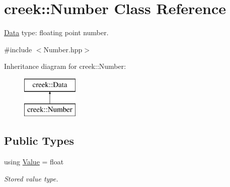 \hypertarget{classcreek_1_1_number}{}\section{creek\+:\+:Number Class Reference}
\label{classcreek_1_1_number}


\hyperlink{classcreek_1_1_data}{Data} type\+: floating point number.  




{\ttfamily \#include $<$Number.\+hpp$>$}

Inheritance diagram for creek\+:\+:Number\+:\begin{figure}[H]
\begin{center}
\leavevmode
\includegraphics[height=2.000000cm]{classcreek_1_1_number}
\end{center}
\end{figure}
\subsection*{Public Types}
\begin{DoxyCompactItemize}
\item 
using \hyperlink{classcreek_1_1_number_ac7b75fc8a57a0a16fa2417b57a538a18}{Value} = float\hypertarget{classcreek_1_1_number_ac7b75fc8a57a0a16fa2417b57a538a18}{}\label{classcreek_1_1_number_ac7b75fc8a57a0a16fa2417b57a538a18}

\begin{DoxyCompactList}\small\item\em Stored value type. \end{DoxyCompactList}\end{DoxyCompactItemize}
